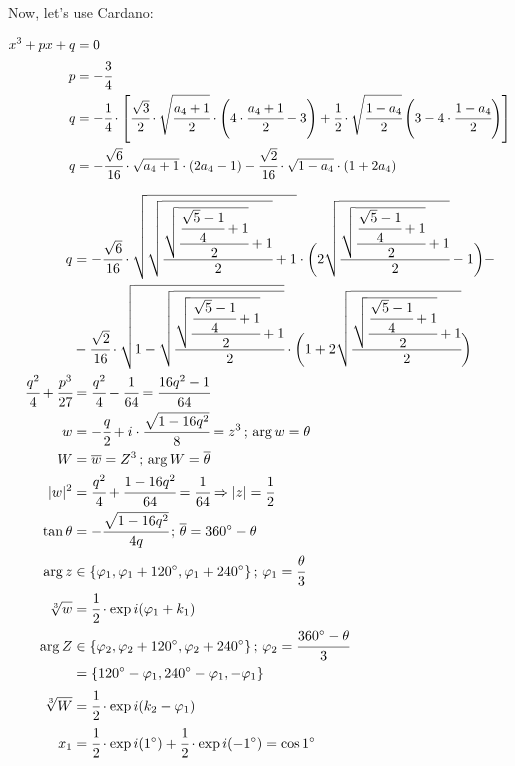 \documentclass[11pt,a4paper]{article}
\begin{document}
Now, let's use Cardano:

\begin{align}
x^3 + px + q &= 0 \\
p &= - \cfrac{3}{4} \\
q &= - \cfrac{1}{4} \cdot \left[\cfrac{\sqrt{3}}{2} \cdot \sqrt{\cfrac{a_4 + 1}{2}} \cdot \left(4 \cdot \cfrac{a_4 + 1}{2} - 3 \right) + \cfrac{1}{2} \cdot \sqrt{\cfrac{1 - a_4}{2}} \left(3 - 4 \cdot \cfrac{1 - a_4}{2} \right) \right] \\
q &= - \cfrac{\sqrt{6}}{16} \cdot \sqrt{a_4 + 1} \cdot (2a_4 - 1 ) - \cfrac{\sqrt{2}}{16} \cdot \sqrt{1 - a_4} \cdot (1 + 2 a_4)
\end{align}

\begin{align}
q &= - \cfrac{\sqrt{6}}{16} \cdot \sqrt{\sqrt{\cfrac{\sqrt{\cfrac{\cfrac{\sqrt{5} - 1}{4} + 1}{2}} + 1}{2}} + 1} \cdot \bigg(2\sqrt{\cfrac{\sqrt{\cfrac{\cfrac{\sqrt{5} - 1}{4} + 1}{2}} + 1}{2}} - 1 \bigg) -\\
  &- \cfrac{\sqrt{2}}{16} \cdot \sqrt{1 - \sqrt{\cfrac{\sqrt{\cfrac{\cfrac{\sqrt{5} - 1}{4} + 1}{2}} + 1}{2}}} \cdot \bigg(1 + 2 \sqrt{\cfrac{\sqrt{\cfrac{\cfrac{\sqrt{5} - 1}{4} + 1}{2}} + 1}{2}}\bigg) \\
\cfrac{q^2}{4} + \cfrac{p^3}{27} &= \cfrac{q^2}{4} - \cfrac{1}{64} = \cfrac{16q^2 - 1}{64} \\
w &= - \cfrac{q}{2} + i \cdot \cfrac{\sqrt{1 - 16 q^2}}{8} = z^3\,;\, \arg w = \theta \\
W &= \overline{w} = Z^3\,;\, \arg W = \overline{\theta} \\
|w|^2 &= \cfrac{q^2}{4} + \cfrac{1 - 16 q^2}{64} = \cfrac{1}{64} \Rightarrow |z| = \cfrac{1}{2} \\
\tan \theta &= - \cfrac{\sqrt{1 - 16q^2}}{4q}\,;\, \overline{\theta} = 360\degree - \theta \\
\arg z &\in \{ \varphi_1, \varphi_1 + 120\degree, \varphi_1 + 240\degree \}\,;\, \varphi_1 = \cfrac{\theta}{3} \\
\sqrt[3]{w} &= \cfrac{1}{2} \cdot \exp i (\varphi_1 + k_1) \\
\arg Z &\in \{ \varphi_2, \varphi_2 + 120\degree, \varphi_2 + 240\degree \}\,;\, \varphi_2 = \cfrac{360\degree - \theta}{3} \\
&= \{ 120\degree  - \varphi_1, 240\degree - \varphi_1, - \varphi_1 \} \\
\sqrt[3]{W} &= \cfrac{1}{2} \cdot \exp i (k_2 - \varphi_1) \\
x_1 &= \cfrac{1}{2} \cdot \exp i (1\degree) + \cfrac{1}{2} \cdot \exp i (-1\degree) = \cos 1\degree \\

\end{align}
\end{document}

